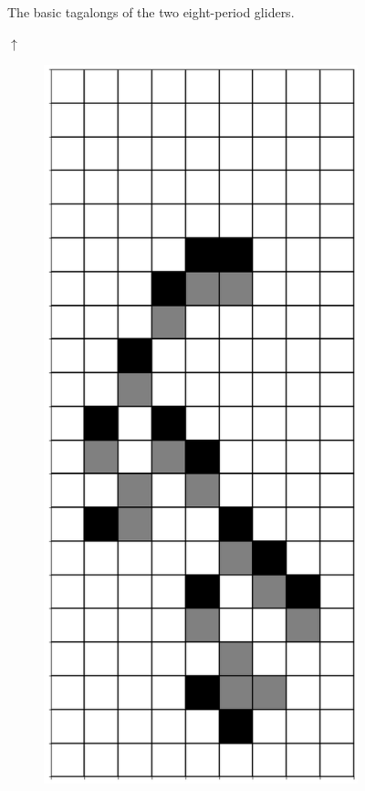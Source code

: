 \documentclass[12pt]{article}
\numberwithin{figure}{section} %
\begin{document}
\begin{figure}[H]
\begin{subfigure}{0.2\textwidth}
     \subcaption{}
	\end{subfigure}
\caption{The basic tagalongs of the two eight-period gliders.}
\end{figure}

\vspace{-.5cm}
\begin{figure}[H]
\begin{center}
{\Large$\uparrow$}
\end{center}
\vspace{-.2cm}
  \begin{subfigure}{0.19\textwidth}
     \centering
     \includegraphics[width=\linewidth]{Section4/25.0}

\end{subfigure}
\end{figure}
\end{document}
